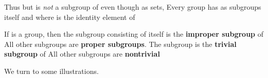 \documentclass[11pt,oneside]{article}
\begin{document}
\begin{BookBody}
Thus  but  is\textit{ not} a subgroup of  even though as sets,  Every group  has as subgroups  itself and  where  is the identity element of 

 If  is a group, then the subgroup consisting of  itself is the\textbf{ improper subgroup} of  All other subgroups are\textbf{ proper subgroups}. The subgroup  is the\textbf{ trivial subgroup} of  All other subgroups are\textbf{ nontrivial}\BookEnd{\blacksquare}

\noindent We turn to some illustrations.

\end{BookBody}

\BookNarrativetrue
\end{document}
